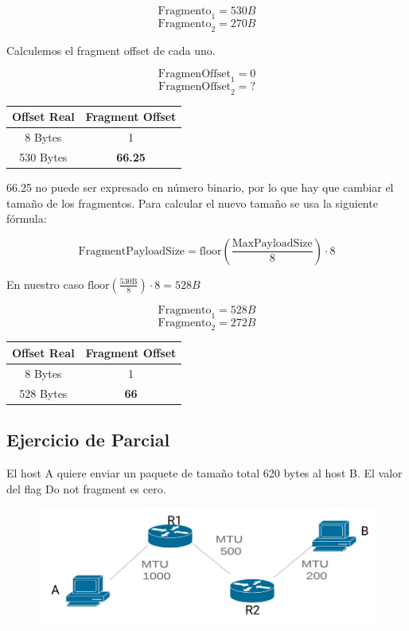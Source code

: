 $$\mathrm{Fragmento}_1 = 530 B$$
$$\mathrm{Fragmento}_2 = 270 B$$

Calculemos el fragment offset de cada uno.

$$ \mathrm{FragmenOffset}_1 = 0 $$
$$ \mathrm{FragmenOffset}_2 =  ? $$

\begin{center}
    \begin{tabular}{c|c}
        Offset Real & Fragment Offset \\
        \hline
        \hline
        8 Bytes & 1 \\
        \hline
        530 Bytes & \textbf{66.25}
    \end{tabular}
\end{center}

66.25 no puede ser expresado en número binario, por lo que hay que cambiar el tamaño de los fragmentos. Para calcular el nuevo tamaño se usa la siguiente fórmula:

$$ \mathrm{FragmentPayloadSize} = \mathrm{floor}(\frac{\mathrm{MaxPayloadSize}}{8}) \cdot 8 $$

En nuestro caso $\mathrm{floor}(\frac{\mathrm{530 B}}{8}) \cdot 8 = 528 B$

$$\mathrm{Fragmento}_1 = 528 B$$
$$\mathrm{Fragmento}_2 = 272 B$$

\begin{center}
    \begin{tabular}{c|c}
        Offset Real & Fragment Offset \\
        \hline
        \hline
        8 Bytes & 1 \\
        \hline
        528 Bytes & \textbf{66}
    \end{tabular}
\end{center}


\subsection{Ejercicio de Parcial}

El host A quiere enviar un paquete de tamaño total 620 bytes al host B. El valor del flag Do not fragment es cero.

\begin{figure}[H]
\centering
\includegraphics[width=\textwidth]{imagenes/frag1.png}
\end{figure}

